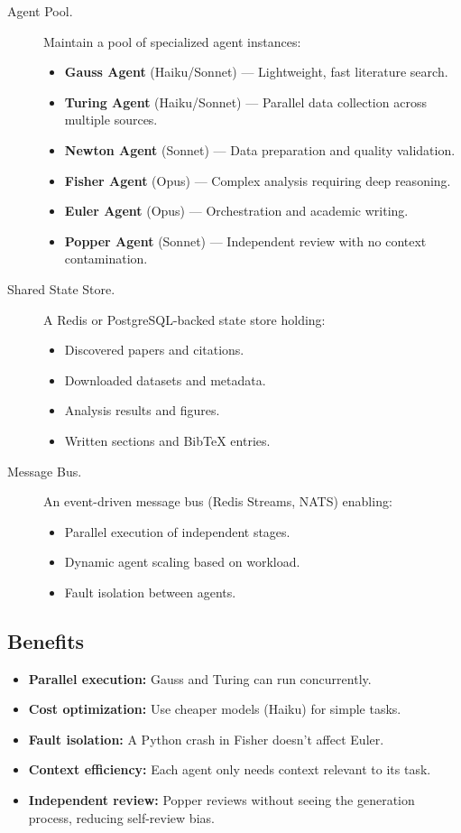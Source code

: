 \begin{description}
  \item[Agent Pool.] Maintain a pool of specialized agent instances:
  \begin{itemize}
    \item \textbf{Gauss Agent} (Haiku/Sonnet) --- Lightweight, fast literature search.
    \item \textbf{Turing Agent} (Haiku/Sonnet) --- Parallel data collection across multiple sources.
    \item \textbf{Newton Agent} (Sonnet) --- Data preparation and quality validation.
    \item \textbf{Fisher Agent} (Opus) --- Complex analysis requiring deep reasoning.
    \item \textbf{Euler Agent} (Opus) --- Orchestration and academic writing.
    \item \textbf{Popper Agent} (Sonnet) --- Independent review with no context contamination.
  \end{itemize}

  \item[Shared State Store.] A Redis or PostgreSQL-backed state store holding:
  \begin{itemize}
    \item Discovered papers and citations.
    \item Downloaded datasets and metadata.
    \item Analysis results and figures.
    \item Written sections and BibTeX entries.
  \end{itemize}

  \item[Message Bus.] An event-driven message bus (Redis Streams, NATS) enabling:
  \begin{itemize}
    \item Parallel execution of independent stages.
    \item Dynamic agent scaling based on workload.
    \item Fault isolation between agents.
  \end{itemize}
\end{description}

\subsection{Benefits}

\begin{itemize}
  \item \textbf{Parallel execution:} Gauss and Turing can run concurrently.
  \item \textbf{Cost optimization:} Use cheaper models (Haiku) for simple tasks.
  \item \textbf{Fault isolation:} A Python crash in Fisher doesn't affect Euler.
  \item \textbf{Context efficiency:} Each agent only needs context relevant to its task.
  \item \textbf{Independent review:} Popper reviews without seeing the generation process, reducing self-review bias.
\end{itemize}

